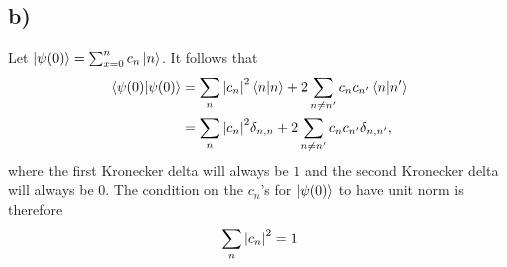 \documentclass{article}
\begin{document}
\subsection*{b)}
Let $\ket{\psi(0)}=\sum_{x=0}^n c_n\ket{n}$. It follows that
\begin{align*}
\braket{\psi(0)} &= \sum_n \abs{c_n}^2 \braket{n} + 2\sum_{n \neq n'} c_nc_{n'} \braket{n}{n'} \\
 &= \sum_n \abs{c_n}^2 \delta_{n,n} + 2\sum_{n \neq n'} c_nc_{n'} \delta_{n,n'}, 
\end{align*}
where the first Kronecker delta will always be $1$ and the second Kronecker delta will always be $0$. The condition on the $c_n$'s for $\ket{\psi(0)}$ to have unit norm is therefore
\begin{equation}
\sum_n \abs{c_n}^2 = 1
\end{equation}
\end{document}
